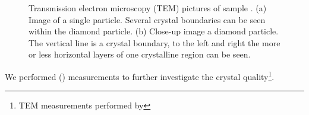 \begin{figure}[tp]
\begin{subfigure}[t]{ 0.49\linewidth}
				\label{subfig::tem_boundary}
			\end{subfigure}
			\caption{Transmission electron microscopy (TEM) pictures of sample \insituH. (a) Image of a single \nd particle. Several crystal boundaries can be seen within the diamond particle. (b) Close-up image a diamond particle. The vertical line is a crystal boundary, to the left and right the more or less horizontal layers of one crystalline region can be seen.}
			\label{fig::tem}
		\end{figure}


		We performed \tem (\TEM) measurements to further investigate the crystal quality\footnote{TEM measurements performed by \schmauch}.

